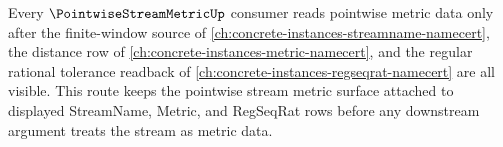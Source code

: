 Every $\PointwiseStreamMetricUp$ consumer reads pointwise metric data only after the finite-window source of \autoref{ch:concrete-instances-streamname-namecert}, the distance row of \autoref{ch:concrete-instances-metric-namecert}, and the regular rational tolerance readback of \autoref{ch:concrete-instances-regseqrat-namecert} are all visible. This route keeps the pointwise stream metric surface attached to displayed StreamName, Metric, and RegSeqRat rows before any downstream argument treats the stream as metric data.
